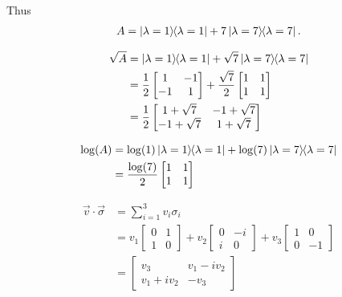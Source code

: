 \vspace{5mm}
Thus
\begin{align*}
	A = \ket{\lambda = 1}\hspace{-1mm} \bra{\lambda = 1} + 7 \ket{\lambda = 7}\hspace{-1mm} \bra{\lambda = 7}.
\end{align*}

\begin{align*}
	\sqrt{A} &= \ket{\lambda = 1}\hspace{-1mm} \bra{\lambda = 1} + \sqrt{7} \ket{\lambda = 7}\hspace{-1mm} \bra{\lambda = 7}\\
		&= \frac{1}{2} \begin{bmatrix}
		1 & -1 \\ 
		-1 & 1
		\end{bmatrix}
		+
		\frac{\sqrt{7}}{2} \begin{bmatrix}
		1 & 1 \\ 
		1 & 1
		\end{bmatrix}\\
		&=
		\frac{1}{2}
		 \begin{bmatrix}
			1+\sqrt{7} & -1+\sqrt{7} \\ 
			-1 + \sqrt{7} & 1+\sqrt{7}
		\end{bmatrix}
\end{align*}

 \begin{align*}
 	\log (A) &=  \log (1) \ket{\lambda = 1}\hspace{-1mm} \bra{\lambda = 1} + \log (7) \ket{\lambda = 7}\hspace{-1mm} \bra{\lambda = 7}\\
 		&= \frac{\log (7)}{2} \begin{bmatrix}
	 		1 & 1 \\ 
	 		1 & 1
 		\end{bmatrix}
 \end{align*}



\begin{align*}
	\vec{v} \cdot \vec{\sigma} &= \sum_{i=1}^3 v_i \sigma_i\\
		&= v_1 \begin{bmatrix}
		0 & 1 \\ 
		1 & 0
		\end{bmatrix}
		+ v_2 \begin{bmatrix}
		0 & -i \\ 
		i & 0
		\end{bmatrix}
		+ v_3 \begin{bmatrix}
		1 & 0 \\ 
		0 & -1
		\end{bmatrix} \\
		&= \begin{bmatrix}
		v_3 & v_1 - i v_2 \\ 
		v_1 + iv_2 & -v_3
		\end{bmatrix}
\end{align*}

